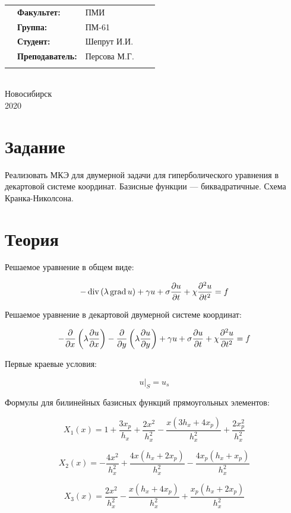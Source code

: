 \begin{center}
{\begin{tabular}{cllp{1.5cm}p{1.5cm}}
& \textbf{Факультет:} & ПМИ & & \\[1.25ex]
& \textbf{Группа:} & ПМ-61 & & \\[1.25ex]
& \textbf{Студент:} & Шепрут И.И. & & \\[1.25ex]
& \textbf{Преподаватель:} & Персова М.Г. & & \\[1.25ex]
&  &  & & \\[1.25ex]
\end{tabular}} \\
\hfill \break
\hfill \break
\hfill \break
\hfill \break
\hfill \break
\large{Новосибирск\\2020}
\end{center}
\thispagestyle{empty}
\newpage 
\setcounter{page}{1}

\section{Задание}

Реализовать МКЭ для двумерной задачи для гиперболического уравнения в декартовой системе координат. Базисные функции --- биквадратичные. Схема Кранка-Николсона.

\section{Теория}

Решаемое уравнение в общем виде:

$$ -\operatorname{div}\left(\lambda\operatorname{grad} u\right) + \gamma u + \sigma \frac{\partial u}{\partial t} + \chi \frac{\partial^{2} u}{\partial t^{2}} = f $$

Решаемое уравнение в декартовой двумерной системе координат:

$$ -\frac{\partial }{\partial x}\left(\lambda\frac{\partial u}{\partial x}\right) - \frac{\partial }{\partial y}\left(\lambda\frac{\partial u}{\partial y}\right) + \gamma u + \sigma \frac{\partial u}{\partial t} + \chi \frac{\partial^{2} u}{\partial t^{2}} = f $$

Первые краевые условия:

$$ u|_{S} = u_s $$

Формулы для билинейных базисных функций прямоугольных элементов:

$$ X_1(x) = 
1 + \frac{3 x_{p}}{h_{x}} + \frac{2 x^{2}}{h_{x}^{2}} - \frac{x \left(3 h_{x} + 4 x_{p}\right)}{h_{x}^{2}} + \frac{2 x_{p}^{2}}{h_{x}^{2}}
$$

$$ X_2(x) = 
- \frac{4 x^{2}}{h_{x}^{2}} + \frac{4 x \left(h_{x} + 2 x_{p}\right)}{h_{x}^{2}} - \frac{4 x_{p} \left(h_{x} + x_{p}\right)}{h_{x}^{2}}
$$

$$ X_3(x) = 
\frac{2 x^{2}}{h_{x}^{2}} - \frac{x \left(h_{x} + 4 x_{p}\right)}{h_{x}^{2}} + \frac{x_{p} \left(h_{x} + 2 x_{p}\right)}{h_{x}^{2}}
$$

